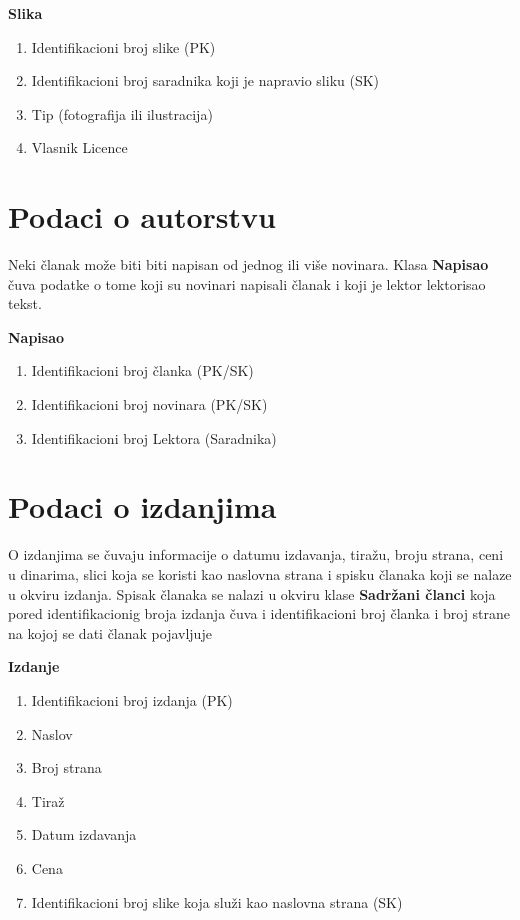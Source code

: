\noindent \textbf{Slika}
\begin{enumerate}
\item Identifikacioni broj slike (PK)
\item Identifikacioni broj saradnika koji je napravio sliku (SK)
\item Tip (fotografija ili ilustracija)
\item Vlasnik Licence
\end{enumerate} \vspace{5mm}


\section{Podaci o autorstvu}

Neki članak može biti biti napisan od jednog ili više novinara. Klasa \textbf{Napisao} čuva podatke o tome koji su novinari napisali članak i koji je lektor lektorisao tekst.

\noindent \textbf{Napisao}
\begin{enumerate}
\item Identifikacioni broj članka (PK/SK)
\item Identifikacioni broj novinara (PK/SK)
\item Identifikacioni broj Lektora (Saradnika)
\end{enumerate} \vspace{5mm}

\section{Podaci o izdanjima}
O izdanjima se čuvaju informacije o datumu izdavanja, tiražu, broju strana, ceni u dinarima, slici koja se koristi kao naslovna strana i spisku članaka koji se nalaze u okviru izdanja. Spisak članaka se nalazi u okviru klase \textbf{Sadržani članci} koja pored identifikacionig broja izdanja čuva i identifikacioni broj članka i broj strane na kojoj se dati članak pojavljuje 


\noindent \textbf{Izdanje}
\begin{enumerate}
\item Identifikacioni broj izdanja (PK)
\item Naslov
\item Broj strana
\item Tiraž
\item Datum izdavanja
\item Cena
\item Identifikacioni broj slike koja služi kao naslovna strana (SK)
\end{enumerate} \vspace{5mm}


